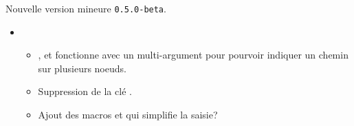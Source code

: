 Nouvelle version mineure \verb+0.5.0-beta+.

\begin{itemize}[itemsep=.5em]
    \item {}
    \begin{itemize}[itemsep=.5em]
        \item {},  et  fonctionne avec un multi-argument pour pourvoir indiquer un chemin sur plusieurs noeuds.
        
        \item Suppression de la clé .
        
        \item Ajout des macros  et  qui simplifie la saisie?
    \end{itemize}


\end{itemize}

\separation
